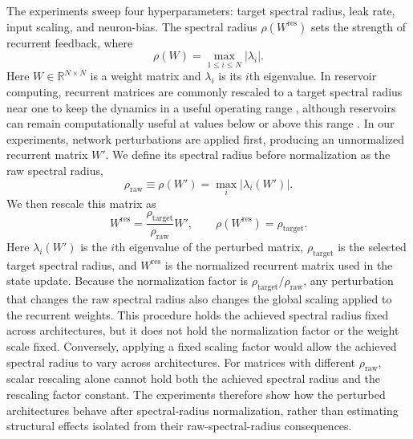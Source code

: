 \documentclass[a4paper,fleqn]{style_neural_networks/cas-dc}
\let\parencite\citep
\begin{document}
\label{sec:hyperparameters}
The experiments sweep four hyperparameters: target spectral radius, leak rate, input scaling, and neuron-bias. The spectral radius \(\rho(W^{\mathrm{res}})\) sets the strength of recurrent feedback, where
\[
\rho(W) = \max_{1 \le i \le N} |\lambda_i|.
\]
Here \(W\in\mathbb{R}^{N\times N}\) is a weight matrix and \(\lambda_i\) is its \(i\)th eigenvalue. In reservoir computing, recurrent matrices are commonly rescaled to a target spectral radius near one to keep the dynamics in a useful operating range \parencite{jaeger_echo_state_2001,Lukosevicius2012PracticalESN}, although reservoirs can remain computationally useful at values below or above this range \parencite{gallicchio_chasing_2019}. In our experiments, network perturbations are applied first, producing an unnormalized recurrent matrix \(W'\). We define its spectral radius before normalization as the raw spectral radius,
\[
\rho_{\mathrm{raw}}
\equiv \rho(W')
=\max_i |\lambda_i(W')|.
\]
We then rescale this matrix as
\[
W^{\mathrm{res}}
=
\frac{\rho_{\mathrm{target}}}{\rho_{\mathrm{raw}}}W',
\qquad
\rho(W^{\mathrm{res}})=\rho_{\mathrm{target}}.
\]
Here \(\lambda_i(W')\) is the \(i\)th eigenvalue of the perturbed matrix, \(\rho_{\mathrm{target}}\) is the selected target spectral radius, and \(W^{\mathrm{res}}\) is the normalized recurrent matrix used in the state update. Because the normalization factor is \(\rho_{\mathrm{target}}/\rho_{\mathrm{raw}}\), any perturbation that changes the raw spectral radius also changes the global scaling applied to the recurrent weights. This procedure holds the achieved spectral radius fixed across architectures, but it does not hold the normalization factor or the weight scale fixed. Conversely, applying a fixed scaling factor would allow the achieved spectral radius to vary across architectures. For matrices with different \(\rho_{\mathrm{raw}}\), scalar rescaling alone cannot hold both the achieved spectral radius and the rescaling factor constant. The experiments therefore show how the perturbed architectures behave after spectral-radius normalization, rather than estimating structural effects isolated from their raw-spectral-radius consequences.
\end{document}
